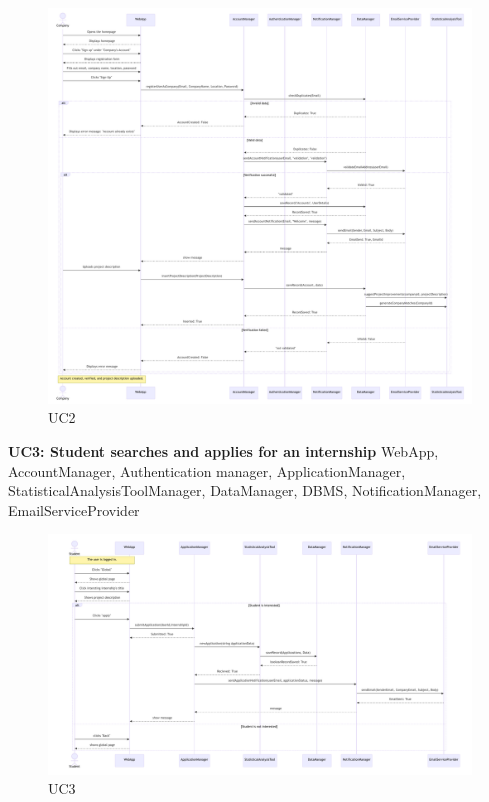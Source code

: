 \begin{figure}[H]
    \centering
    \hspace{-1cm} %
    \includegraphics[width=1.1\linewidth]{DD//Images/SequenceDiagrams/UC2.pdf}
    \caption{UC2}
\end{figure}

\newpage
\textbf{UC3: Student searches and applies for an internship}
WebApp, AccountManager, Authentication manager, ApplicationManager, StatisticalAnalysisToolManager, DataManager, DBMS, NotificationManager, EmailServiceProvider

\begin{figure}[H]
    \centering
    \includegraphics[width=1.1\linewidth]{DD//Images/SequenceDiagrams/UC3.pdf}
    \caption{UC3}
\end{figure}

